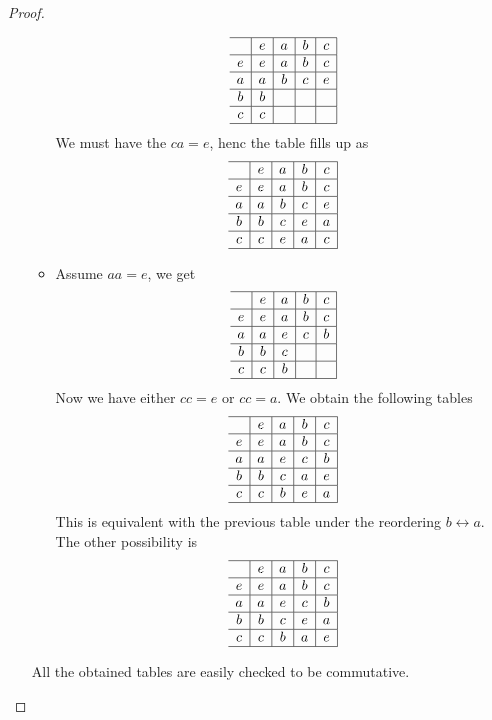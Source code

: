 \documentclass[a4paper, 11pt]{book}
\theoremstyle{plain}
\theoremstyle{plain}
\begin{document}
\begin{proof}
\begin{enumerate}
\begin{itemize}
                          $$\begin{array}{c|c|c|c|c|}
    \hline
      & e & a & b & c\\
    \hline
    e & e & a & b & c\\
    \hline
    a & a & b & c & e\\
    \hline
    b & b &   &   &  \\
    \hline
    c & c &   &   &  \\
    \hline
    \end{array}$$  
    We must have the $ca=e$, henc the table fills up as
                           $$\begin{array}{c|c|c|c|c|}
    \hline
      & e & a & b & c\\
    \hline
    e & e & a & b & c\\
    \hline
    a & a & b & c & e\\
    \hline
    b & b & c & e & a \\
    \hline
    c & c & e & a & c\\
    \hline
    \end{array}$$    
    \item Assume $aa=e$, we get
                       $$\begin{array}{c|c|c|c|c|}
    \hline
      & e & a & b & c\\
    \hline
    e & e & a & b & c\\
    \hline
    a & a & e & c & b\\
    \hline
    b & b & c &   &  \\
    \hline
    c & c & b &   &  \\
    \hline
    \end{array}$$ 
    Now we have either $cc=e$ or $cc=a$. We obtain the following tables
                           $$\begin{array}{c|c|c|c|c|}
    \hline
      & e & a & b & c\\
    \hline
    e & e & a & b & c\\
    \hline
    a & a & e & c & b\\
    \hline
    b & b & c & a & e\\
    \hline
    c & c & b & e & a\\
    \hline
    \end{array}$$ 
    This is equivalent with the previous table under the reordering $b\leftrightarrow a$. The other possibility is
                           $$\begin{array}{c|c|c|c|c|}
    \hline
      & e & a & b & c\\
    \hline
    e & e & a & b & c\\
    \hline
    a & a & e & c & b\\
    \hline
    b & b & c & e & a \\
    \hline
    c & c & b & a & e \\
    \hline
    \end{array}$$ 
    \end{itemize}
    All the obtained tables are easily checked to be commutative.
\end{enumerate}
\end{proof}
\end{document}
